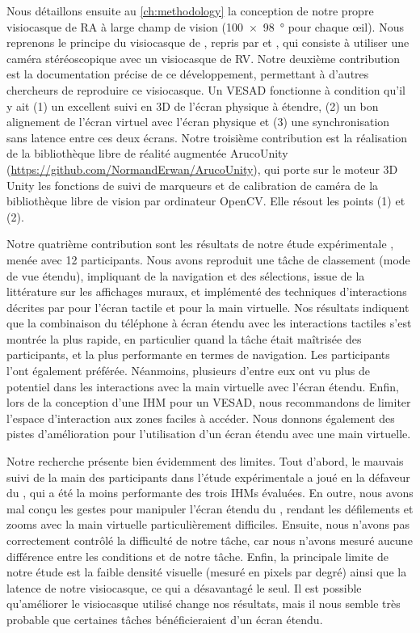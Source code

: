 Nous détaillons ensuite au \autoref{ch:methodology} la conception de notre propre visiocasque de RA à large champ de vision (\SI{100x98}{\degree} pour chaque \oe il). Nous reprenons le principe du visiocasque de \cite{Steptoe2013}, repris par \cite{Steptoe2014} et \cite{Piumsomboon2014}, qui consiste à utiliser une caméra stéréoscopique  avec un visiocasque de RV. Notre deuxième contribution est la documentation précise de ce développement, permettant à d'autres chercheurs de reproduire ce visiocasque. Un VESAD fonctionne à condition qu'il y ait (1) un excellent suivi en 3D de l'écran physique à étendre, (2) un bon alignement de l'écran virtuel avec l'écran physique et (3) une synchronisation sans latence entre ces deux écrans. Notre troisième contribution est la réalisation de la bibliothèque libre de réalité augmentée ArucoUnity (\url{https://github.com/NormandErwan/ArucoUnity}), qui porte sur le moteur 3D Unity les fonctions de suivi de marqueurs et de calibration de caméra de la bibliothèque libre de vision par ordinateur OpenCV. Elle résout les points (1) et (2).

Notre quatrième contribution sont les résultats de notre étude expérimentale , menée avec 12 participants. Nous avons reproduit une tâche de classement (mode de vue étendu), impliquant de la navigation et des sélections, issue de la littérature sur les affichages muraux, et implémenté des techniques d'interactions décrites par \cite{Wobbrock2009} pour l'écran tactile et \cite{Piumsomboon2013} pour la main virtuelle. Nos résultats indiquent que la combinaison du téléphone à écran étendu avec les interactions tactiles s'est montrée la plus rapide, en particulier quand la tâche était maîtrisée des participants, et la plus performante en termes de navigation. Les participants l'ont également préférée. Néanmoins, plusieurs d'entre eux ont vu plus de potentiel dans les interactions avec la main virtuelle avec l'écran étendu. Enfin, lors de la conception d'une IHM pour un VESAD, nous recommandons de limiter l'espace d'interaction aux zones faciles à accéder. Nous donnons également des pistes d'amélioration pour l'utilisation d'un écran étendu avec une main virtuelle.

Notre recherche présente bien évidemment des limites. Tout d'abord, le mauvais suivi de la main des participants dans l'étude expérimentale a joué en la défaveur du , qui a été la moins performante des trois IHMs évaluées. En outre, nous avons mal conçu les gestes pour manipuler l'écran étendu du , rendant les défilements et zooms avec la main virtuelle particulièrement difficiles. Ensuite, nous n'avons pas correctement contrôlé la difficulté de notre tâche, car nous n'avons mesuré aucune différence entre les conditions  et  de notre tâche. Enfin, la principale limite de notre étude est la faible densité visuelle (mesuré en pixels par degré) ainsi que la latence de notre visiocasque, ce qui a désavantagé le  seul. Il est possible qu'améliorer le visiocasque utilisé change nos résultats, mais il nous semble très probable que certaines tâches bénéficieraient d'un écran étendu.

